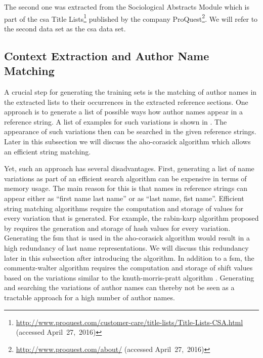 \bigskip

The second one was extracted from the Sociological Abstracts Module which is part of the \gls{csa} Title Lists\footnote{\url{http://www.proquest.com/customer-care/title-lists/Title-Lists-CSA.html} (accessed April~27,~2016)} published by the company ProQuest\footnote{\url{http://www.proquest.com/about/} (accessed April~27,~2016)}.
We will refer to the second data set as the \gls{csa} data set.


\subsection{Context Extraction and Author Name Matching}
A crucial step for generating the training sets is the matching of author names in the extracted lists to their occurrences in the extracted reference sections.
One approach is to generate a list of possible ways how author names appear in a reference string.
A list of examples for such variations is shown in .
The appearance of such variations then can be searched in the given reference strings.
Later in this subsection we will discuss the \gls{aho-corasick algorithm} which allows an efficient string matching.

\bigskip

Yet, such an approach has several disadvantages.
First, generating a list of name variations as part of an efficient search algorithm can be expensive in terms of memory usage.
The main reason for this is that names in reference strings can appear either as ``first name last name'' or as ``last name, fist name''.
Efficient string matching algorithms require the computation and storage of values for every variation that is generated.
For example, the \gls{rabin-karp algorithm} proposed by \citet{karp1987efficient} requires the generation and storage of hash values for every variation.
Generating the \gls{fsm} that is used in the \gls{aho-corasick algorithm} would result in a high redundancy of last name representations.
We will discuss this redundancy later in this subsection after introducing the algorithm.
In addition to a \gls{fsm}, the \gls{commentz-walter algorithm} \citep{commentz1979string} requires the computation and storage of shift values based on the variations similar to the \gls{knuth-morris-pratt algorithm} \citep{knuth1977fast}.
Generating and searching the variations of author names can thereby not be seen as a tractable approach for a high number of author names.


